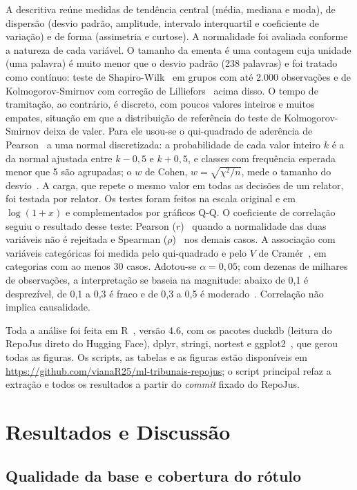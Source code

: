 \documentclass[conference]{IEEEtran}
\begin{document}
A descritiva reúne medidas de tendência central (média, mediana e moda), de
dispersão (desvio padrão, amplitude, intervalo interquartil e coeficiente de
variação) e de forma (assimetria e curtose). A normalidade foi avaliada
conforme a natureza de cada variável. O tamanho da ementa é uma contagem cuja
unidade (uma palavra) é muito menor que o desvio padrão (238 palavras) e foi
tratado como contínuo: teste de Shapiro-Wilk~\cite{shapiro} em grupos com até
2.000 observações e de Kolmogorov-Smirnov com correção de
Lilliefors~\cite{lilliefors} acima disso. O tempo de tramitação, ao contrário, é
discreto, com poucos valores inteiros e muitos empates, situação em que a
distribuição de referência do teste de Kolmogorov-Smirnov deixa de valer. Para
ele usou-se o qui-quadrado de aderência de Pearson~\cite{pearson1900} a uma
normal discretizada: a probabilidade de cada valor inteiro $k$ é a da normal
ajustada entre $k-0{,}5$ e $k+0{,}5$, e classes com frequência esperada menor
que 5 são agrupadas; o $w$ de Cohen, $w=\sqrt{\chi^2/n}$, mede o tamanho do
desvio~\cite{cohen}. A carga, que repete o mesmo valor em todas as decisões de
um relator, foi testada por relator. Os testes foram feitos na escala original
e em $\log(1+x)$ e complementados por gráficos Q-Q. O coeficiente de
correlação seguiu o resultado desse teste: Pearson ($r$)~\cite{pearson} quando
a normalidade das duas variáveis não é rejeitada e Spearman
($\rho$)~\cite{spearman} nos demais casos. A associação com variáveis
categóricas foi medida pelo qui-quadrado e pelo $V$ de Cramér~\cite{cramer}, em
categorias com ao menos 30 casos. Adotou-se $\alpha = 0{,}05$; com dezenas de
milhares de observações, a interpretação se baseia na magnitude: abaixo de 0,1
é desprezível, de 0,1 a 0,3 é fraco e de 0,3 a 0,5 é moderado~\cite{cohen}.
Correlação não implica causalidade.

Toda a análise foi feita em R~\cite{rcore}, versão 4.6, com os pacotes duckdb
(leitura do RepoJus direto do Hugging Face), dplyr, stringi, nortest e
ggplot2~\cite{ggplot2}, que gerou todas as figuras. Os scripts, as tabelas e as
figuras estão disponíveis em \url{https://github.com/vianaR25/ml-tribunais-repojus};
o script principal refaz a extração e todos os resultados a partir do
\emph{commit} fixado do RepoJus.

\section{Resultados e Discussão}\label{sec:resultados}

\subsection{Qualidade da base e cobertura do rótulo}\label{sec:base}
\end{document}
